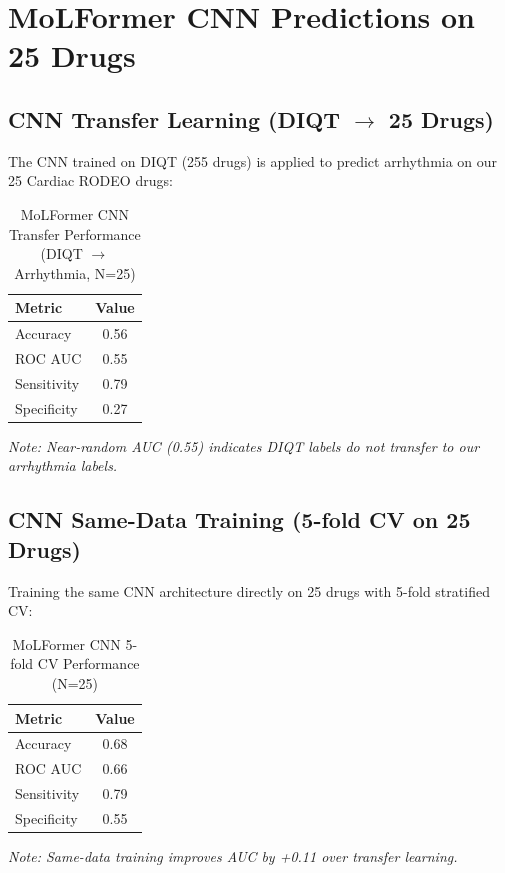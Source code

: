 \documentclass[11pt]{article}
\begin{document}
\section{MoLFormer CNN Predictions on 25 Drugs}

\subsection{CNN Transfer Learning (DIQT $\rightarrow$ 25 Drugs)}

The CNN trained on DIQT (255 drugs) is applied to predict arrhythmia on our 25 Cardiac RODEO drugs:

\begin{table}[H]
\centering
\caption{MoLFormer CNN Transfer Performance (DIQT $\rightarrow$ Arrhythmia, N=25)}
\begin{tabular}{lc}
\toprule
\textbf{Metric} & \textbf{Value} \\
\midrule
Accuracy & 0.56 \\
ROC AUC & 0.55 \\
Sensitivity & 0.79 \\
Specificity & 0.27 \\
\bottomrule
\end{tabular}
\end{table}

\textit{Note: Near-random AUC (0.55) indicates DIQT labels do not transfer to our arrhythmia labels.}

\subsection{CNN Same-Data Training (5-fold CV on 25 Drugs)}

Training the same CNN architecture directly on 25 drugs with 5-fold stratified CV:

\begin{table}[H]
\centering
\caption{MoLFormer CNN 5-fold CV Performance (N=25)}
\begin{tabular}{lc}
\toprule
\textbf{Metric} & \textbf{Value} \\
\midrule
Accuracy & 0.68 \\
ROC AUC & 0.66 \\
Sensitivity & 0.79 \\
Specificity & 0.55 \\
\bottomrule
\end{tabular}
\end{table}

\textit{Note: Same-data training improves AUC by +0.11 over transfer learning.}
\end{document}
